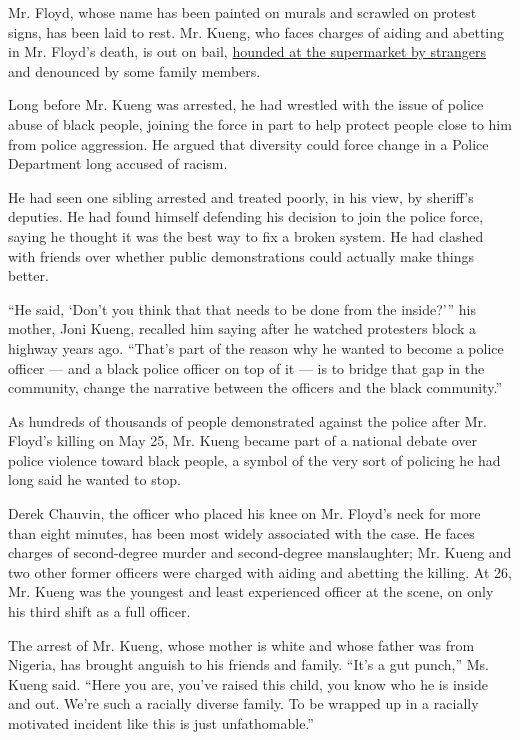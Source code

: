 Mr. Floyd, whose name has been painted on murals and scrawled on protest
signs, has been laid to rest. Mr. Kueng, who faces charges of aiding and
abetting in Mr. Floyd's death, is out on bail,
\href{https://twitter.com/worldstar/status/1274746480486764544?s=21}{hounded
at the supermarket by strangers} and denounced by some family members.

Long before Mr. Kueng was arrested, he had wrestled with the issue of
police abuse of black people, joining the force in part to help protect
people close to him from police aggression. He argued that diversity
could force change in a Police Department long accused of racism.

He had seen one sibling arrested and treated poorly, in his view, by
sheriff's deputies. He had found himself defending his decision to join
the police force, saying he thought it was the best way to fix a broken
system. He had clashed with friends over whether public demonstrations
could actually make things better.

``He said, `Don't you think that that needs to be done from the
inside?''' his mother, Joni Kueng, recalled him saying after he watched
protesters block a highway years ago. ``That's part of the reason why he
wanted to become a police officer --- and a black police officer on top
of it --- is to bridge that gap in the community, change the narrative
between the officers and the black community.''

As hundreds of thousands of people demonstrated against the police after
Mr. Floyd's killing on May 25, Mr. Kueng became part of a national
debate over police violence toward black people, a symbol of the very
sort of policing he had long said he wanted to stop.

Derek Chauvin, the officer who placed his knee on Mr. Floyd's neck for
more than eight minutes, has been most widely associated with the case.
He faces charges of second-degree murder and second-degree manslaughter;
Mr. Kueng and two other former officers were charged with aiding and
abetting the killing. At 26, Mr. Kueng was the youngest and least
experienced officer at the scene, on only his third shift as a full
officer.

The arrest of Mr. Kueng, whose mother is white and whose father was from
Nigeria, has brought anguish to his friends and family. ``It's a gut
punch,'' Ms. Kueng said. ``Here you are, you've raised this child, you
know who he is inside and out. We're such a racially diverse family. To
be wrapped up in a racially motivated incident like this is just
unfathomable.''

